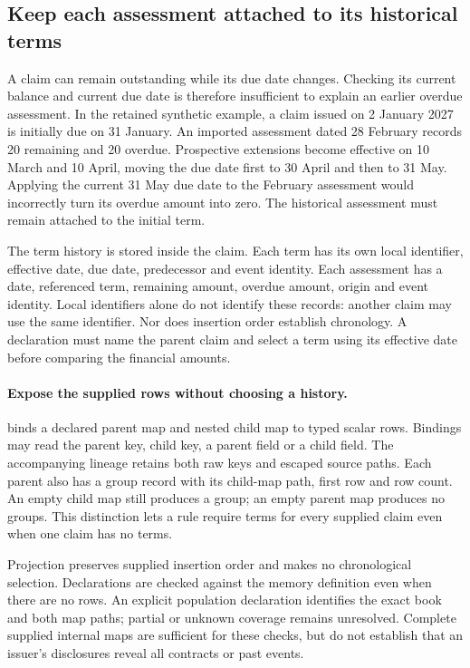 \subsection{Keep each assessment attached to its historical terms}
\label{sec:nested-term-invariants}

A claim can remain outstanding while its due date changes. Checking its
current balance and current due date is therefore insufficient to explain an
earlier overdue assessment. In the retained synthetic example, a claim issued
on 2 January 2027 is initially due on 31 January. An imported assessment dated
28 February records 20 remaining and 20 overdue. Prospective extensions become
effective on 10 March and 10 April, moving the due date first to 30 April and
then to 31 May. Applying the current 31 May due date to the February assessment
would incorrectly turn its overdue amount into zero. The historical assessment
must remain attached to the initial term.

The term history is stored inside the claim. Each term has its own local
identifier, effective date, due date, predecessor and event identity. Each
assessment has a date, referenced term, remaining amount, overdue amount,
origin and event identity. Local identifiers alone do not identify these
records: another claim may use the same identifier. Nor does insertion order
establish chronology. A declaration must name the parent claim and select a
term using its effective date before comparing the financial amounts.

\paragraph{Expose the supplied rows without choosing a history.}
 binds a declared parent map and nested child map
to typed scalar rows. Bindings may read the parent key, child key, a parent
field or a child field. The accompanying lineage retains both raw keys and
escaped source paths. Each parent also has a group record with its child-map
path, first row and row count. An empty child map still produces a group;
an empty parent map produces no groups. This distinction lets a rule require
terms for every supplied claim even when one claim has no terms.

Projection preserves supplied insertion order and makes no chronological
selection. Declarations are checked against the memory definition even when
there are no rows. An explicit population declaration identifies the exact
book and both map paths; partial or unknown coverage remains unresolved.
Complete supplied internal maps are sufficient for these checks, but do not
establish that an issuer's disclosures reveal all contracts or past events.

